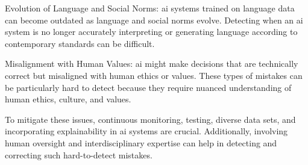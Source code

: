 \begin{aibox}
Evolution of Language and Social Norms: \gls{ai} systems trained on language data can become outdated as language and social norms evolve. Detecting when an \gls{ai} system is no longer accurately interpreting or generating language according to contemporary standards can be difficult.

Misalignment with Human Values: \gls{ai} might make decisions that are technically correct but misaligned with human ethics or values. These types of mistakes can be particularly hard to detect because they require nuanced understanding of human ethics, culture, and values.

To mitigate these issues, continuous monitoring, testing, diverse data sets, and incorporating explainability in \gls{ai} systems are crucial. Additionally, involving human oversight and interdisciplinary expertise can help in detecting and correcting such hard-to-detect mistakes.
\end{aibox}